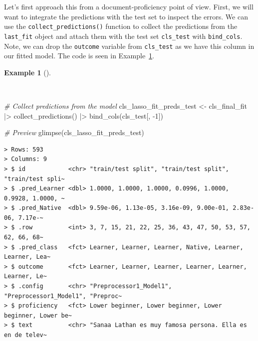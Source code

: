 \documentclass[
  letterpaper,
]{latex/krantz}
\newenvironment{Shaded}{\begin{snugshade}}{\end{snugshade}}
\newcommand{\CommentTok}[1]{\textcolor[rgb]{0.00,0.00,0.00}{\textit{#1}}}
\newcommand{\DecValTok}[1]{\textcolor[rgb]{0.00,0.00,0.00}{#1}}
\newcommand{\FunctionTok}[1]{\textcolor[rgb]{0.00,0.00,0.00}{#1}}
\newcommand{\NormalTok}[1]{\textcolor[rgb]{0.00,0.00,0.00}{#1}}
\newcommand{\OtherTok}[1]{\textcolor[rgb]{0.00,0.00,0.00}{#1}}
\newcommand{\SpecialCharTok}[1]{\textcolor[rgb]{0.00,0.00,0.00}{#1}}
\theoremstyle{definition}
\newtheorem{example}{Example}[chapter]
\theoremstyle{remark}
\begin{document}
Let's first approach this from a document-proficiency point of view.
First, we will want to integrate the predictions with the test set to
inspect the errors. We can use the \texttt{collect\_predictions()}
function to collect the predictions from the \texttt{last\_fit} object
and attach them with the test set \texttt{cls\_test} with
\texttt{bind\_cols}. Note, we can drop the \texttt{outcome} variable
from \texttt{cls\_test} as we have this column in our fitted model. The
code is seen in
Example~\ref{exm-pda-class-tune-hyperparameters-integrate-test}.

\begin{example}[]\protect\hypertarget{exm-pda-class-tune-hyperparameters-integrate-test}{}\label{exm-pda-class-tune-hyperparameters-integrate-test}

~

\begin{Shaded}
\begin{Highlighting}[]
\CommentTok{\# Collect predictions from the model}
\NormalTok{cls\_lasso\_fit\_preds\_test }\OtherTok{\textless{}{-}}
\NormalTok{  cls\_final\_fit }\SpecialCharTok{|\textgreater{}}
  \FunctionTok{collect\_predictions}\NormalTok{() }\SpecialCharTok{|\textgreater{}}
  \FunctionTok{bind\_cols}\NormalTok{(cls\_test[, }\SpecialCharTok{{-}}\DecValTok{1}\NormalTok{])}

\CommentTok{\# Preview}
\FunctionTok{glimpse}\NormalTok{(cls\_lasso\_fit\_preds\_test)}
\end{Highlighting}
\end{Shaded}

\begin{verbatim}
> Rows: 593
> Columns: 9
> $ id            <chr> "train/test split", "train/test split", "train/test spli~
> $ .pred_Learner <dbl> 1.0000, 1.0000, 1.0000, 0.0996, 1.0000, 0.9928, 1.0000, ~
> $ .pred_Native  <dbl> 9.59e-06, 1.13e-05, 3.16e-09, 9.00e-01, 2.83e-06, 7.17e-~
> $ .row          <int> 3, 7, 15, 21, 22, 25, 36, 43, 47, 50, 53, 57, 62, 66, 68~
> $ .pred_class   <fct> Learner, Learner, Learner, Native, Learner, Learner, Lea~
> $ outcome       <fct> Learner, Learner, Learner, Learner, Learner, Learner, Le~
> $ .config       <chr> "Preprocessor1_Model1", "Preprocessor1_Model1", "Preproc~
> $ proficiency   <fct> Lower beginner, Lower beginner, Lower beginner, Lower be~
> $ text          <chr> "Sanaa Lathan es muy famosa persona. Ella es en de telev~
\end{verbatim}

\end{example}
\end{document}
